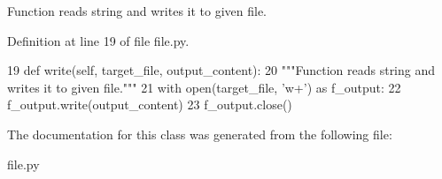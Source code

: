 \begin{DoxyVerb}Function reads string and writes it to given file.\end{DoxyVerb}
 

Definition at line 19 of file file.\+py.


\begin{DoxyCode}
19     \textcolor{keyword}{def }write(self, target\_file, output\_content):
20         \textcolor{stringliteral}{"""Function reads string and writes it to given file."""}
21         with open(target\_file, \textcolor{stringliteral}{'w+'}) \textcolor{keyword}{as} f\_output:
22             f\_output.write(output\_content)
23             f\_output.close()
\end{DoxyCode}


The documentation for this class was generated from the following file\+:\begin{DoxyCompactItemize}
\item 
file.\+py\end{DoxyCompactItemize}
